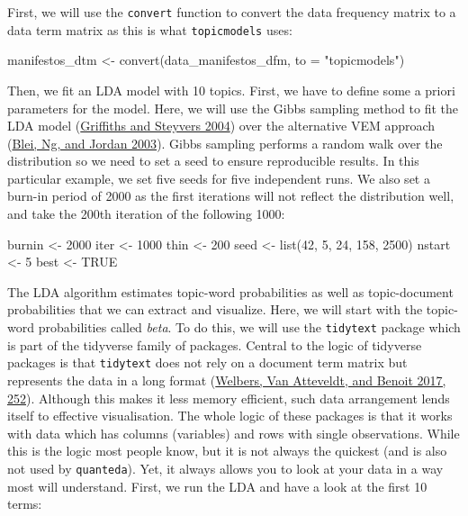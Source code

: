 \documentclass[
]{book}
\newenvironment{Shaded}{\begin{snugshade}}{\end{snugshade}}
\newcommand{\AttributeTok}[1]{\textcolor[rgb]{0.77,0.63,0.00}{#1}}
\newcommand{\ConstantTok}[1]{\textcolor[rgb]{0.00,0.00,0.00}{#1}}
\newcommand{\DecValTok}[1]{\textcolor[rgb]{0.00,0.00,0.81}{#1}}
\newcommand{\FunctionTok}[1]{\textcolor[rgb]{0.00,0.00,0.00}{#1}}
\newcommand{\NormalTok}[1]{#1}
\newcommand{\OtherTok}[1]{\textcolor[rgb]{0.56,0.35,0.01}{#1}}
\newcommand{\StringTok}[1]{\textcolor[rgb]{0.31,0.60,0.02}{#1}}
\begin{document}
First, we will use the \texttt{convert} function to convert the data frequency matrix to a data term matrix as this is what \texttt{topicmodels} uses:

\begin{Shaded}
\begin{Highlighting}[]
\NormalTok{manifestos\_dtm }\OtherTok{\textless{}{-}} \FunctionTok{convert}\NormalTok{(data\_manifestos\_dfm, }\AttributeTok{to =} \StringTok{"topicmodels"}\NormalTok{)}
\end{Highlighting}
\end{Shaded}

Then, we fit an LDA model with 10 topics. First, we have to define some a priori parameters for the model. Here, we will use the Gibbs sampling method to fit the LDA model (\protect\hyperlink{ref-Griffiths2004a}{Griffiths and Steyvers 2004}) over the alternative VEM approach (\protect\hyperlink{ref-Blei2003a}{Blei, Ng, and Jordan 2003}). Gibbs sampling performs a random walk over the distribution so we need to set a seed to ensure reproducible results. In this particular example, we set five seeds for five independent runs. We also set a burn-in period of 2000 as the first iterations will not reflect the distribution well, and take the 200th iteration of the following 1000:

\begin{Shaded}
\begin{Highlighting}[]
\NormalTok{burnin }\OtherTok{\textless{}{-}} \DecValTok{2000}
\NormalTok{iter }\OtherTok{\textless{}{-}} \DecValTok{1000}
\NormalTok{thin }\OtherTok{\textless{}{-}} \DecValTok{200}
\NormalTok{seed }\OtherTok{\textless{}{-}} \FunctionTok{list}\NormalTok{(}\DecValTok{42}\NormalTok{, }\DecValTok{5}\NormalTok{, }\DecValTok{24}\NormalTok{, }\DecValTok{158}\NormalTok{, }\DecValTok{2500}\NormalTok{)}
\NormalTok{nstart }\OtherTok{\textless{}{-}} \DecValTok{5}
\NormalTok{best }\OtherTok{\textless{}{-}} \ConstantTok{TRUE}
\end{Highlighting}
\end{Shaded}

The LDA algorithm estimates topic-word probabilities as well as topic-document probabilities that we can extract and visualize. Here, we will start with the topic-word probabilities called \emph{beta}. To do this, we will use the \texttt{tidytext} package which is part of the tidyverse family of packages. Central to the logic of tidyverse packages is that \texttt{tidytext} does not rely on a document term matrix but represents the data in a long format (\protect\hyperlink{ref-Welbers2017}{Welbers, Van Atteveldt, and Benoit 2017, 252}). Although this makes it less memory efficient, such data arrangement lends itself to effective visualisation. The whole logic of these packages is that it works with data which has columns (variables) and rows with single observations. While this is the logic most people know, but it is not always the quickest (and is also not used by \texttt{quanteda}). Yet, it always allows you to look at your data in a way most will understand. First, we run the LDA and have a look at the first 10 terms:
\end{document}
